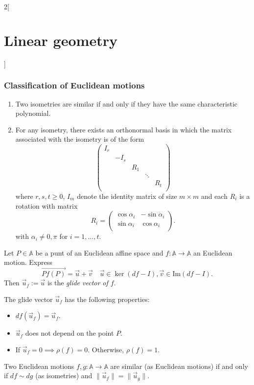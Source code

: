 \documentclass[class=article,10pt,crop=false]{standalone}
\begin{document}
\begin{multicols}{2}[\section{Linear geometry}]
\subsubsection*{Classification of Euclidean motions}
\begin{theorem}
\hfill
\begin{enumerate}
    \item Two isometries are similar if and only if they have the same characteristic polynomial.
    \item For any isometry, there exists an orthonormal basis in which the matrix associated with the isometry is of the form  $$\begin{pmatrix}
    I_r &&&&\\
    & -I_s &&&\\
    && R_1 &&\\
    &&& \ddots &\\
    &&&& R_t\\
    \end{pmatrix}$$ where $r,s,t\geq 0$, $I_m$ denote the identity matrix of size $m\times m$ and each $R_i$ is a rotation with matrix $$R_i=\begin{pmatrix}
    \cos\alpha_i & -\sin\alpha_i\\
    \sin\alpha_i & \cos\alpha_i\\
    \end{pmatrix}.$$ with $\alpha_i\ne0,\pi$ for $i=1,\ldots,t$.
\end{enumerate}
\end{theorem}
\begin{definition}
Let $P\in\mathbb{A}$ be a punt of an Euclidean affine space and $f:\mathbb{A}\rightarrow\mathbb{A}$ an Euclidean motion. Express $$\overrightarrow{Pf(P)}=\overrightarrow{u}+\overrightarrow{v}\quad\overrightarrow{u}\in\ker(df-I),\overrightarrow{v}\in\text{Im}(df-I).$$ Then $\overrightarrow{u}_f:=\overrightarrow{u}$ is the \textit{glide vector of $f$}.
\end{definition}
\begin{prop}
The glide vector $\overrightarrow{u}_f$ has the following properties:
\begin{itemize}
    \item $df(\overrightarrow{u}_f)=\overrightarrow{u}_f$.
    \item $\overrightarrow{u}_f$ does not depend on the point $P$.
    \item If $\overrightarrow{u}_f=0\implies\rho(f)=0$. Otherwise, $\rho(f)=1$.
\end{itemize}
\end{prop}
\begin{theorem}
Two Euclidean motions $f,g:\mathbb{A}\rightarrow\mathbb{A}$ are similar (as Euclidean motions) if and only if $df\sim dg$ (as isometries) and $\|\overrightarrow{u}_f\|=\|\overrightarrow{u}_g\|$.
\end{theorem}

\end{multicols}
\end{document}
